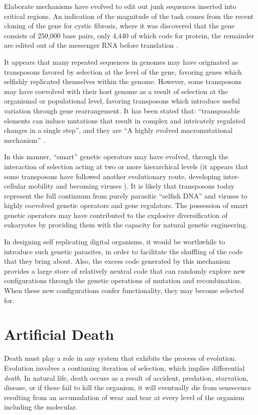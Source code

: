Elaborate mechanisms have evolved to edit out junk sequences inserted
into critical regions.  An indication of the magnitude of the task comes
from the recent cloning of the gene for cystic fibrosis, where it was
discovered that the gene consists of 250,000 base pairs, only 4,440 of
which code for protein, the remainder are edited out of the messenger RNA
before translation \cite{Kere,Marx,Rior,Romm}.

It appears that many repeated sequences in genomes may have originated
as transposons favored by selection at the level of the gene, favoring
genes which selfishly replicated themselves within the genome.  However,
some transposons may have coevolved with their host genome as a result of
selection at the organismal or populational level, favoring transposons
which introduce useful variation through gene rearrangement.  It has
been stated that: ``transposable elements can induce mutations that
result in complex and intricately regulated changes in a single step'',
and they are ``A highly evolved macromutational mechanism'' \cite{Syva}.

In this manner, ``smart'' genetic operators may have evolved, through
the interaction of selection acting at two or more hierarchical levels
(it appears that some transposons have followed another evolutionary
route, developing inter-cellular mobility and becoming viruses
\cite{JeSc}).  It is likely that transposons today represent the full
continuum from purely parasitic ``selfish DNA'' and viruses to highly
coevolved genetic operators and gene regulators.  The possession of
smart genetic operators may have contributed to the explosive
diversification of eukaryotes by providing them with the capacity for
natural genetic engineering.

In designing self replicating digital organisms, it would be worthwhile
to introduce such genetic parasites, in order to facilitate the shuffling
of the code that they bring about.  Also, the excess code generated by
this mechanism provides a large store of relatively neutral code that
can randomly explore new configurations through the genetic operations
of mutation and recombination.  When these new configurations confer
functionality, they may become selected for.

\section{Artificial Death}

Death must play a role in any system that exhibits the process of
evolution.  Evolution involves a continuing iteration of selection,
which implies differential {\it death}.  In natural life, death
occurs as a result of accident, predation, starvation, disease,
or if these fail to kill the organism, it will eventually die from
senescence resulting from an accumulation of wear and tear at every
level of the organism including the molecular.

